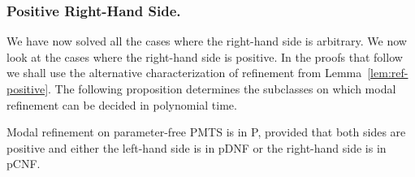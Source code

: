 \subsubsection{Positive Right-Hand Side.}
We have now solved all the cases where the right-hand side is arbitrary.
We now look at the cases where the right-hand side is positive.
In the proofs that follow we shall use the alternative characterization
of refinement from Lemma~\ref{lem:ref-positive}.
The following proposition determines the subclasses on which modal refinement 
can be decided in polynomial time.

\begin{proposition}
Modal refinement on parameter-free PMTS is in P, provided that 
both sides are positive and 
either the left-hand side is in pDNF or the right-hand side is in pCNF.
\end{proposition}
